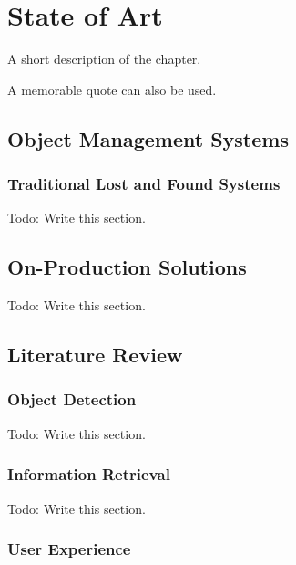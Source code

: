 
\chapter{State of Art}%
\label{chapter:state_of_art}

\begin{introduction}
A short description of the chapter.

A memorable quote can also be used.
\end{introduction}

\section{Object Management Systems}

\subsection{Traditional Lost and Found Systems}

Todo: Write this section.


\section{On-Production Solutions}

Todo: Write this section.

\section{Literature Review}

\subsection{Object Detection}

Todo: Write this section.

\subsection{Information Retrieval}

Todo: Write this section.

\subsection{User Experience}

